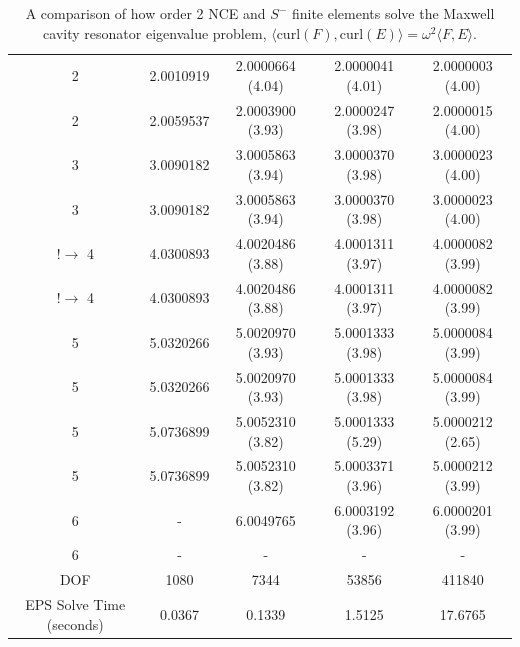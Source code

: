 \documentclass[manuscript,screen]{acmart}
\newcommand{\akg}[1]{\textcolor{blue}{\textbf{AG:} #1}}
\begin{document}
\begin{center}
\begin{table}
\begin{tabular}{ c c c c c }
2 & 2.0010919 & 2.0000664 (4.04) & 2.0000041 (4.01) & 2.0000003 (4.00)  \\
2 & 2.0059537 & 2.0003900 (3.93) & 2.0000247 (3.98) & 2.0000015 (4.00)\\
3 & 3.0090182 & 3.0005863 (3.94) & 3.0000370 (3.98) & 3.0000023 (4.00) \\
3 & 3.0090182 & 3.0005863 (3.94) & 3.0000370 (3.98) & 3.0000023 (4.00) \\
$! \rightarrow$ 4 & 4.0300893 & 4.0020486 (3.88) & 4.0001311 (3.97) & 4.0000082 (3.99) \\
$! \rightarrow$ 4 & 4.0300893 & 4.0020486 (3.88) & 4.0001311 (3.97) & 4.0000082 (3.99) \\
5 & 5.0320266 & 5.0020970 (3.93)& 5.0001333 (3.98) & 5.0000084 (3.99) \\
5 & 5.0320266 & 5.0020970 (3.93)& 5.0001333 (3.98) & 5.0000084 (3.99) \\
5 & 5.0736899 & 5.0052310 (3.82) & 5.0001333 (5.29) & 5.0000212 (2.65) \\
5 & 5.0736899 & 5.0052310 (3.82) & 5.0003371 (3.96) & 5.0000212 (3.99) \\
6 & - & 6.0049765 & 6.0003192 (3.96) & 6.0000201 (3.99) \\
6 & - & - & - & - \\
\hline
DOF  & 1080 & 7344 & 53856 & 411840 \\
\hline
EPS Solve Time (seconds) & 0.0367 & 0.1339 & 1.5125 & 17.6765 \\
\hline

\end{tabular}
\caption{A comparison of how order 2 NCE and $S^-$ finite elements solve the Maxwell cavity resonator eigenvalue problem, $\langle \text{curl}(F), \text{curl}(E) \rangle = \omega^2 \langle F, E \rangle$. }  
\label{tab:Eigenvalue}
\end{table}
\end{center}

\end{document}
